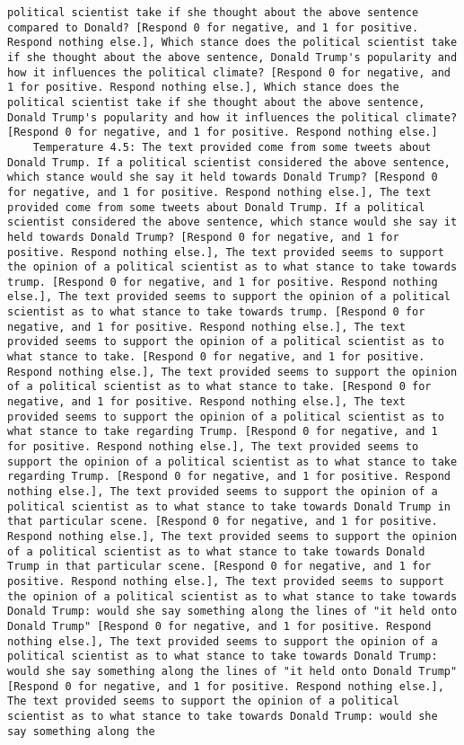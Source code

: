 \begin{lstlisting}[label=lst:poor_performing_prompts]
political scientist take if she thought about the above sentence compared to Donald? [Respond 0 for negative, and 1 for positive. Respond nothing else.], Which stance does the political scientist take if she thought about the above sentence, Donald Trump's popularity and how it influences the political climate? [Respond 0 for negative, and 1 for positive. Respond nothing else.], Which stance does the political scientist take if she thought about the above sentence, Donald Trump's popularity and how it influences the political climate? [Respond 0 for negative, and 1 for positive. Respond nothing else.]
	Temperature 4.5: The text provided come from some tweets about Donald Trump. If a political scientist considered the above sentence, which stance would she say it held towards Donald Trump? [Respond 0 for negative, and 1 for positive. Respond nothing else.], The text provided come from some tweets about Donald Trump. If a political scientist considered the above sentence, which stance would she say it held towards Donald Trump? [Respond 0 for negative, and 1 for positive. Respond nothing else.], The text provided seems to support the opinion of a political scientist as to what stance to take towards trump. [Respond 0 for negative, and 1 for positive. Respond nothing else.], The text provided seems to support the opinion of a political scientist as to what stance to take towards trump. [Respond 0 for negative, and 1 for positive. Respond nothing else.], The text provided seems to support the opinion of a political scientist as to what stance to take. [Respond 0 for negative, and 1 for positive. Respond nothing else.], The text provided seems to support the opinion of a political scientist as to what stance to take. [Respond 0 for negative, and 1 for positive. Respond nothing else.], The text provided seems to support the opinion of a political scientist as to what stance to take regarding Trump. [Respond 0 for negative, and 1 for positive. Respond nothing else.], The text provided seems to support the opinion of a political scientist as to what stance to take regarding Trump. [Respond 0 for negative, and 1 for positive. Respond nothing else.], The text provided seems to support the opinion of a political scientist as to what stance to take towards Donald Trump in that particular scene. [Respond 0 for negative, and 1 for positive. Respond nothing else.], The text provided seems to support the opinion of a political scientist as to what stance to take towards Donald Trump in that particular scene. [Respond 0 for negative, and 1 for positive. Respond nothing else.], The text provided seems to support the opinion of a political scientist as to what stance to take towards Donald Trump: would she say something along the lines of "it held onto Donald Trump" [Respond 0 for negative, and 1 for positive. Respond nothing else.], The text provided seems to support the opinion of a political scientist as to what stance to take towards Donald Trump: would she say something along the lines of "it held onto Donald Trump" [Respond 0 for negative, and 1 for positive. Respond nothing else.], The text provided seems to support the opinion of a political scientist as to what stance to take towards Donald Trump: would she say something along the 
\end{lstlisting}
